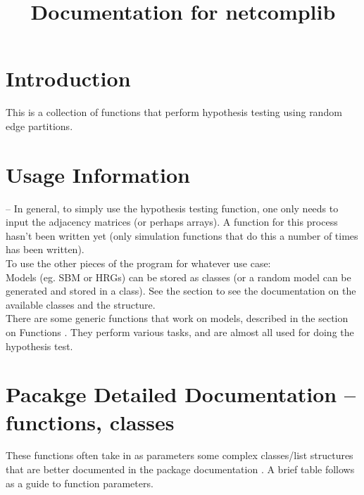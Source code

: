 \documentclass[11pt]{article}
\begin{document}
\title{Documentation for netcomplib}

\maketitle
\tableofcontents
\pagebreak

\listoftodos

\pagebreak

\section{Introduction}

This is a collection of functions that perform hypothesis testing using random edge partitions. 


\section{Usage Information}
 -- In general, to simply use the hypothesis testing function, one only needs to input the adjacency matrices (or perhaps arrays). A function for this process hasn't been written yet (only simulation functions that do this a number of times has been written). \\

To use the other pieces of the program for whatever use case: \\

Models (eg. SBM or HRGs) can be stored as classes (or a random model can be generated and stored in a class). See the section  to see the documentation on the available classes and the structure. \\

There are some generic functions that work on models, described in the section on Functions . They perform various tasks, and are almost all used for doing the hypothesis test. \\

\section{Pacakge Detailed Documentation -- functions, classes}
These functions often take in as parameters some complex classes/list structures that are better documented in the package documentation . A brief table follows as a guide to function parameters. \\
\end{document}

